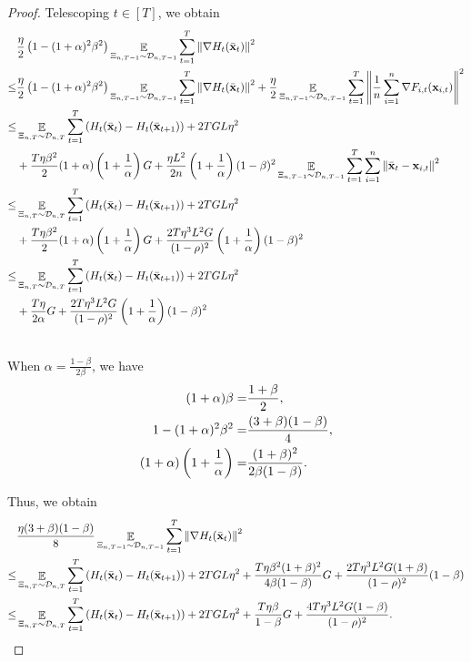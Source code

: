 \documentclass{article}
\begin{document}
\begin{proof}
Telescoping $t\in[T]$, we obtain
\begin{align}
\nonumber
& \frac{\eta}{2} \left(  1-(1+\alpha)^2\beta^2  \right) \mathop{\mathbb{E}}_{ \Xi_{n,T-1} \sim \mathcal{D}_{n,T-1} }\sum_{t=1}^T\left\lVert\nabla H_t(\bar{{\bf x}}_t)\right\rVert^2 \\ \nonumber
\le & \frac{\eta}{2} \left(  1-(1+\alpha)^2\beta^2  \right) \mathop{\mathbb{E}}_{ \Xi_{n,T-1} \sim \mathcal{D}_{n,T-1} }\sum_{t=1}^T\left\lVert\nabla H_t(\bar{{\bf x}}_t)\right\rVert^2 + \frac{\eta}{2}  \mathop{\mathbb{E}}_{ \Xi_{n,T-1} \sim \mathcal{D}_{n,T-1} }\sum_{t=1}^T\left\lVert\frac{1}{n}\sum_{i=1}^n \nabla F_{i,t}({\bf x}_{i,t})\right\rVert^2 \\ \nonumber
\le & \mathop{\mathbb{E}}_{ \Xi_{n,T} \sim \mathcal{D}_{n,T} } \sum_{t=1}^T \left( H_t(\bar{{\bf x}}_t) - H_t(\bar{{\bf x}}_{t+1}) \right)  + 2TGL\eta^2 \\ \nonumber 
& + \frac{T\eta \beta^2}{2} (1+\alpha) \left( 1+\frac{1}{\alpha} \right)  G  + \frac{\eta L^2}{2n} \left( 1+\frac{1}{\alpha} \right)(1-\beta)^2\mathop{\mathbb{E}}_{ \Xi_{n,T-1} \sim \mathcal{D}_{n,T-1} }\sum_{t=1}^T\sum_{i=1}^n\left\lVert\bar{{\bf x}}_t - {\bf x}_{i,t}\right\rVert^2 \\ \nonumber
\le & \mathop{\mathbb{E}}_{ \Xi_{n,T} \sim \mathcal{D}_{n,T} } \sum_{t=1}^T \left( H_t(\bar{{\bf x}}_t) - H_t(\bar{{\bf x}}_{t+1}) \right)  + 2TGL\eta^2 \\ \nonumber 
& + \frac{T\eta \beta^2}{2} (1+\alpha) \left( 1+\frac{1}{\alpha} \right)  G  + \frac{2T\eta^3 L^2 G}{(1-\rho)^2} \left( 1+\frac{1}{\alpha} \right)(1-\beta)^2 \\ \nonumber
\le & \mathop{\mathbb{E}}_{ \Xi_{n,T} \sim \mathcal{D}_{n,T} } \sum_{t=1}^T \left( H_t(\bar{{\bf x}}_t) - H_t(\bar{{\bf x}}_{t+1}) \right)  + 2TGL\eta^2 \\ \nonumber 
& + \frac{T\eta}{2\alpha}   G  + \frac{2T\eta^3 L^2 G}{(1-\rho)^2} \left( 1+\frac{1}{\alpha} \right)(1-\beta)^2 \\ \nonumber
\end{align}


When $\alpha = \frac{1-\beta}{2\beta}$, we have
\begin{align}
\nonumber
(1+\alpha)\beta = & \frac{1+\beta}{2}, \\ \nonumber
1-(1+\alpha)^2\beta^2 = & \frac{(3+\beta)(1-\beta)}{4}, \\ \nonumber
(1+\alpha) \left( 1+\frac{1}{\alpha} \right) = & \frac{(1+\beta)^2}{2\beta(1-\beta)}.
\end{align}

Thus, we obtain
\begin{align}
\nonumber
& \frac{\eta(3+\beta)(1-\beta)}{8}  \mathop{\mathbb{E}}_{ \Xi_{n,T-1} \sim \mathcal{D}_{n,T-1} }\sum_{t=1}^T\left\lVert\nabla H_t(\bar{{\bf x}}_t)\right\rVert^2 \\ \nonumber
\le & \mathop{\mathbb{E}}_{ \Xi_{n,T} \sim \mathcal{D}_{n,T} } \sum_{t=1}^T \left( H_t(\bar{{\bf x}}_t) - H_t(\bar{{\bf x}}_{t+1}) \right)  + 2TGL\eta^2  + \frac{T\eta \beta^2(1+\beta)^2}{4\beta(1-\beta)}  G  + \frac{2T\eta^3 L^2 G(1+\beta)}{(1-\rho)^2}(1-\beta) \\ \nonumber
\le & \mathop{\mathbb{E}}_{ \Xi_{n,T} \sim \mathcal{D}_{n,T} } \sum_{t=1}^T \left( H_t(\bar{{\bf x}}_t) - H_t(\bar{{\bf x}}_{t+1}) \right)  + 2TGL\eta^2  + \frac{T\eta \beta}{1-\beta}  G  + \frac{4T\eta^3 L^2 G(1-\beta)}{(1-\rho)^2}.
\end{align}




\end{proof}
\end{document}
